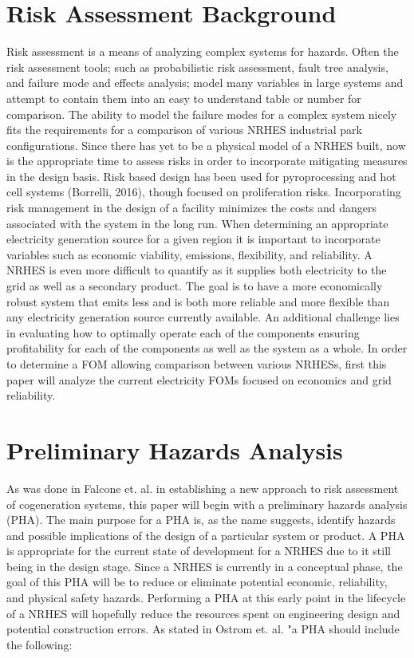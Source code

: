 \documentclass[12pt]{UIdahoMastersThesis}
\begin{document}
\section{Risk Assessment Background}
Risk assessment is a means of analyzing complex systems for hazards. Often the risk assessment tools; such as probabilistic risk assessment, fault tree analysis, and failure mode and effects analysis; model many variables in large systems and attempt to contain them into an easy to understand table or number for comparison. The ability to model the failure modes for a complex system nicely fits the requirements for a comparison of various NRHES industrial park configurations. Since there has yet to be a physical model of a NRHES built, now is the appropriate time to assess risks in order to incorporate mitigating measures in the design basis. Risk based design has been used for pyroprocessing and hot cell systems (Borrelli, 2016), though focused on proliferation risks. Incorporating risk management in the design of a facility minimizes the costs and dangers associated with the system in the long run.
	When determining an appropriate electricity generation source for a given region it is important to incorporate variables such as economic viability, emissions, flexibility, and reliability. A NRHES is even more difficult to quantify as it supplies both electricity to the grid as well as a secondary product. The goal is to have a more economically robust system that emits less and is both more reliable and more flexible than any electricity generation source currently available. An additional challenge lies in evaluating how to optimally operate each of the components ensuring profitability for each of the components as well as the system as a whole. In order to determine a FOM allowing comparison between various NRHESs, first this paper will analyze the current electricity FOMs focused on economics and grid reliability.

\section{Preliminary Hazards Analysis}
As was done in Falcone et. al. in establishing a new approach to risk assessment of cogeneration systems, this paper will begin with a preliminary hazards analysis (PHA). The main purpose for a PHA is, as the name suggests, identify hazards and possible implications of the design of a particular system or product.  A PHA is appropriate for the current state of development for a NRHES due to it still being in the design stage. Since a NRHES is currently in a conceptual phase, the goal of this PHA will be to reduce or eliminate potential economic, reliability, and physical safety hazards. Performing a PHA at this early point in the lifecycle of a NRHES will hopefully reduce the resources spent on engineering design and potential construction errors. As stated in Ostrom et. al.  "a PHA should include the following:
\end{document}
